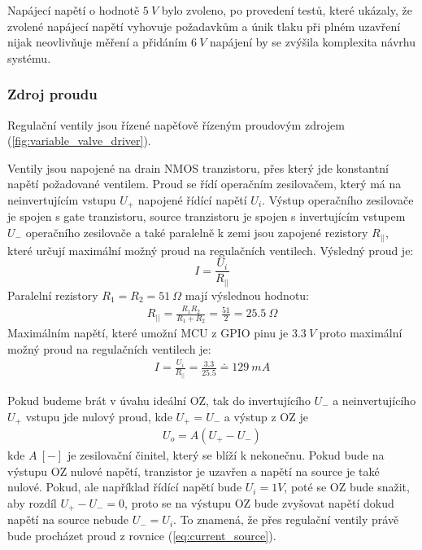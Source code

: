 Napájecí napětí o hodnotě $5 \ V$ bylo zvoleno, po provedení testů, které ukázaly, že zvolené napájecí napětí vyhovuje požadavkům a únik tlaku při plném uzavření nijak neovlivňuje měření a přidáním $6 \ V$ napájení by se zvýšila komplexita návrhu systému.

\subsubsection{Zdroj proudu}
Regulační ventily jsou řízené napěťově řízeným proudovým zdrojem (\ref{fig:variable_valve_driver}).\par
Ventily jsou napojené na drain NMOS tranzistoru, přes který jde konstantní napětí požadované ventilem. Proud se řídí operačním zesilovačem, který má na neinvertujícím vstupu $U_+$ napojené řídící napětí $U_i$. Výstup operačního zesilovače je spojen s gate tranzistoru, source tranzistoru je spojen s invertujícím vstupem $U_-$ operačního zesilovače a také paralelně k zemi jsou zapojené rezistory $R_{||}$, které určují maximální možný proud na regulačních ventilech. Výsledný proud je:
\begin{equation}
    \label{eq:current_source}
    I = \frac{U_i}{R_{||}}
\end{equation}
Paralelní rezistory $R_1 = R_2 = 51 \ \Omega$ mají výslednou hodnotu:
\begin{align*}
    R_{||} = \frac{R_1 R_2}{R_1 + R_2} = \frac{51}{2} = 25.5 \ \Omega
\end{align*}
Maximálním napětí, které umožní MCU z GPIO pinu je $3.3 \ V$ proto maximální možný proud na regulačních ventilech je:
\begin{align*}
    I = \frac{U_i}{R_{||}} = \frac{3.3}{25.5} \doteq  129 \ mA
\end{align*}

Pokud budeme brát v úvahu ideální OZ, tak do invertujícího $U_-$ a neinvertujícího $U_+$ vstupu jde nulový proud, kde $U_+ = U_-$ a výstup z OZ je
\begin{align}
    U_o = A(U_+ - U_-)
\end{align}
kde $A \ [-] $ je zesilovační činitel, který se blíží k nekonečnu. Pokud bude na výstupu OZ nulové napětí, tranzistor je uzavřen a napětí na source je také nulové. Pokud, ale například řídící napětí bude  $U_i = 1V$, poté se OZ bude snažit, aby rozdíl $U_+ - U_- = 0$, proto se na výstupu OZ bude zvyšovat napětí dokud napětí na source nebude $U_- = U_i$. To znamená, že přes regulační ventily právě bude procházet proud z rovnice (\ref{eq:current_source}).

